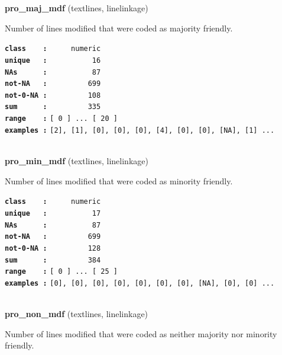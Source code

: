 \documentclass[]{article}
\begin{document}
\textbf{pro\_maj\_mdf} (textlines, linelinkage)

Number of lines modified that were coded as majority friendly.

\textbf{\texttt{class\ \ \ \ :}} \texttt{~~~~~numeric}\\
\textbf{\texttt{unique\ \ \ :}} \texttt{~~~~~~~~~~16}\\
\textbf{\texttt{NAs\ \ \ \ \ \ :}} \texttt{~~~~~~~~~~87}\\
\textbf{\texttt{not-NA\ \ \ :}} \texttt{~~~~~~~~~699}\\
\textbf{\texttt{not-0-NA\ :}} \texttt{~~~~~~~~~108}\\
\textbf{\texttt{sum\ \ \ \ \ \ :}} \texttt{~~~~~~~~~335}\\
\textbf{\texttt{range\ \ \ \ :}}
\texttt{{[}\ 0\ {]}\ ...\ {[}\ 20\ {]}}\\
\textbf{\texttt{examples\ :}}
\texttt{{[}2{]},\ {[}1{]},\ {[}0{]},\ {[}0{]},\ {[}0{]},\ {[}4{]},\ {[}0{]},\ {[}0{]},\ {[}NA{]},\ {[}1{]}\ ...}\\

~

\textbf{pro\_min\_mdf} (textlines, linelinkage)

Number of lines modified that were coded as minority friendly.

\textbf{\texttt{class\ \ \ \ :}} \texttt{~~~~~numeric}\\
\textbf{\texttt{unique\ \ \ :}} \texttt{~~~~~~~~~~17}\\
\textbf{\texttt{NAs\ \ \ \ \ \ :}} \texttt{~~~~~~~~~~87}\\
\textbf{\texttt{not-NA\ \ \ :}} \texttt{~~~~~~~~~699}\\
\textbf{\texttt{not-0-NA\ :}} \texttt{~~~~~~~~~128}\\
\textbf{\texttt{sum\ \ \ \ \ \ :}} \texttt{~~~~~~~~~384}\\
\textbf{\texttt{range\ \ \ \ :}}
\texttt{{[}\ 0\ {]}\ ...\ {[}\ 25\ {]}}\\
\textbf{\texttt{examples\ :}}
\texttt{{[}0{]},\ {[}0{]},\ {[}0{]},\ {[}0{]},\ {[}0{]},\ {[}0{]},\ {[}0{]},\ {[}NA{]},\ {[}0{]},\ {[}0{]}\ ...}\\

~

\textbf{pro\_non\_mdf} (textlines, linelinkage)

Number of lines modified that were coded as neither majority nor
minority friendly.
\end{document}
